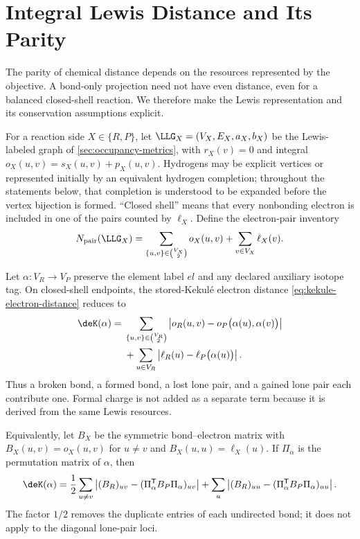 \section{Integral Lewis Distance and Its Parity}
\label{sec:lewis-parity}

The parity of chemical distance depends on the resources represented by the
objective.  A bond-only projection need not have even distance, even for a
balanced closed-shell reaction.  We therefore make the Lewis representation
and its conservation assumptions explicit.

\begin{definition}
For a reaction side \(X\in\{R,P\}\), let
\(\LLG_X=(V_X,E_X,a_X,b_X)\) be the Lewis-labeled graph of
\cref{sec:occupancy-metrics}, with \(r_X(v)=0\) and integral
\(o_X(u,v)=s_X(u,v)+p_X(u,v)\).  Hydrogens may be explicit vertices or
represented initially by an equivalent hydrogen completion; throughout the
statements below, that completion is understood to be expanded before the
vertex bijection is formed.  ``Closed shell'' means that every nonbonding
electron is included in one of the pairs counted by \(\ell_X\).  Define the
electron-pair inventory
\begin{equation}
  N_{\mathrm{pair}}(\LLG_X)
  =
  \sum_{\{u,v\}\in\binom{V_X}{2}}o_X(u,v)
  +
  \sum_{v\in V_X}\ell_X(v).
  \label{eq:pair-inventory}
\end{equation}
\end{definition}

Let \(\alpha:V_R\to V_P\) preserve the element label \(el\) and any declared
auxiliary isotope tag.  On
closed-shell endpoints, the stored-Kekul\'e electron distance
\cref{eq:kekule-electron-distance} reduces to
\begin{align}
\deK(\alpha)
={}&
\sum_{\{u,v\}\in\binom{V_R}{2}}
\left|
  o_R(u,v)-o_P\bigl(\alpha(u),\alpha(v)\bigr)
\right|
\nonumber\\
&+
\sum_{u\in V_R}
\left|
  \ell_R(u)-\ell_P\bigl(\alpha(u)\bigr)
\right|.
\label{eq:lewis-distance}
\end{align}
Thus a broken bond, a formed bond, a lost lone pair, and a gained lone pair
each contribute one.  Formal charge is not added as a separate term because
it is derived from the same Lewis resources.

Equivalently, let \(B_X\) be the symmetric bond--electron matrix with
\(B_X(u,v)=o_X(u,v)\) for \(u\ne v\) and \(B_X(u,u)=\ell_X(u)\).  If
$\Pi_\alpha$ is the permutation matrix of $\alpha$, then
\begin{equation}
  \deK(\alpha)
  =
  \frac12\sum_{u\ne v}
  \left|
    (B_R)_{uv}
    -
    (\Pi_\alpha^{\mathsf T}B_P\Pi_\alpha)_{uv}
  \right|
  +
  \sum_u
  \left|
    (B_R)_{uu}
    -
    (\Pi_\alpha^{\mathsf T}B_P\Pi_\alpha)_{uu}
  \right|.
  \label{eq:be-distance}
\end{equation}
The factor $1/2$ removes the duplicate entries of each undirected bond; it
does not apply to the diagonal lone-pair loci.

